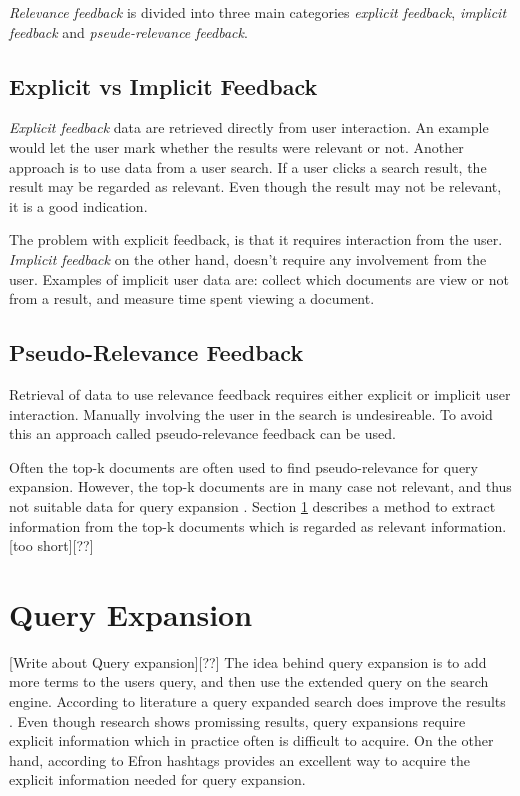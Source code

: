 \textit{Relevance feedback} is divided into three main categories \textit{explicit feedback}, \textit{implicit feedback} and \textit{pseude-relevance feedback}.

\subsection{Explicit vs Implicit Feedback}
\textit{Explicit feedback} data are retrieved directly from user interaction.
An example would let the user mark whether the results were relevant or not.
Another approach is to use data from a user search.
If a user clicks a search result, the result may be regarded as relevant.
Even though the result may not be relevant, it is a good indication.

The problem with explicit feedback, is that it requires interaction from the user.
\textit{Implicit feedback} on the other hand, doesn't require any involvement from the user.
Examples of implicit user data are:
collect which documents are view or not from a result, and measure time spent viewing a document.

\subsection{Pseudo-Relevance Feedback}
Retrieval of data to use relevance feedback requires either explicit or implicit user interaction.
Manually involving the user in the search is undesireable.
To avoid this an approach called pseudo-relevance feedback can be used.

Often the top-k documents are often used to find pseudo-relevance for query expansion.
However, the top-k documents are in many case not relevant, and thus not suitable data for query expansion \cite{pseudo-relevance-invalid}.
Section \ref{sec:query-expansion} describes a method to extract information from the top-k documents which is regarded as relevant information.
[too short][??]

\section{Query Expansion}
\label{sec:query-expansion}
[Write about Query expansion][??]
The idea behind query expansion is to add more terms to the users query, and then use the extended query on the search engine.
According to literature a query expanded search does improve the results \cite[ch. 5]{ir-book}.
Even though research shows promissing results, query expansions require explicit information which in practice often is difficult to acquire.
On the other hand, according to Efron \cite{ir-hashtag} hashtags provides an excellent way to acquire the explicit information needed for query expansion.

